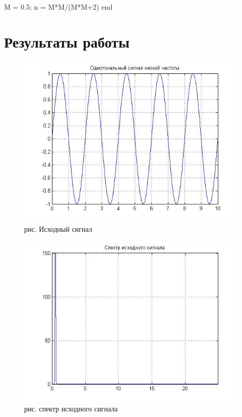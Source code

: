\documentclass[10pt,a4paper]{report}
\begin{document}
M = 0.5;\newline
n = M*M/(M*M+2)\newline
end

\section{Результаты работы}
\begin{figure}
\begin{center}
\includegraphics[angle=0, scale = 0.9]{7_1.jpg}\newline
рис. Исходный сигнал\newline
\end{center}
\end{figure}
\begin{figure}
\begin{center}
\includegraphics[angle=0, scale = 0.9]{7_2.jpg}\newline
рис. спектр исходного сигнала\newline
\end{center}
\end{figure}
\end{document}
